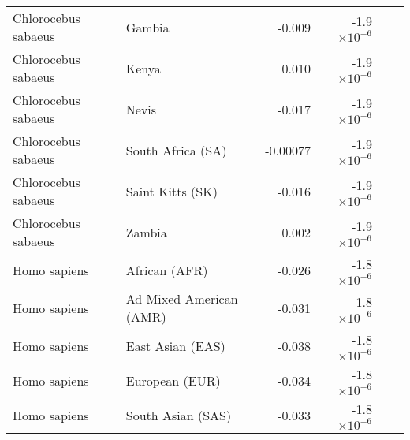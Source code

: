 \begin{tabular}{|l|l|r|r|r|r|}
 Chlorocebus sabaeus &                          Gambia  &   -0.009 & -1.9$\times 10^{-6}$ \\
 Chlorocebus sabaeus &                           Kenya  &    0.010 & -1.9$\times 10^{-6}$ \\
 Chlorocebus sabaeus &                           Nevis  &   -0.017 & -1.9$\times 10^{-6}$ \\
 Chlorocebus sabaeus &               South Africa (SA)  & -0.00077 & -1.9$\times 10^{-6}$ \\
 Chlorocebus sabaeus &                Saint Kitts (SK)  &   -0.016 & -1.9$\times 10^{-6}$ \\
 Chlorocebus sabaeus &                          Zambia  &    0.002 & -1.9$\times 10^{-6}$ \\
        Homo sapiens &                   African (AFR)  &   -0.026 & -1.8$\times 10^{-6}$ \\
        Homo sapiens &         Ad Mixed American (AMR)  &   -0.031 & -1.8$\times 10^{-6}$ \\
        Homo sapiens &                East Asian (EAS)  &   -0.038 & -1.8$\times 10^{-6}$ \\
        Homo sapiens &                  European (EUR)  &   -0.034 & -1.8$\times 10^{-6}$ \\
        Homo sapiens &               South Asian (SAS)  &   -0.033 & -1.8$\times 10^{-6}$ \\
\bottomrule
\end{tabular}

